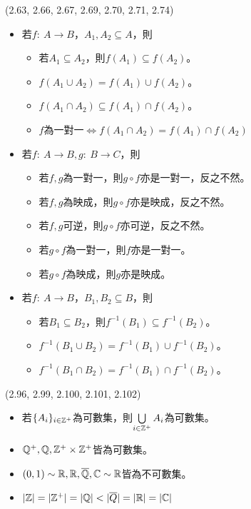\item \begin{theorem}{(2.63, 2.66, 2.67, 2.69, 2.70, 2.71, 2.74)} \quad\quad
    \begin{itemize}
        \item 若$f: \ A \rightarrow B$，$A_1, A_2 \subseteq A$，則
            \begin{itemize}
                \item 若$A_1 \subseteq A_2$，則$f(A_1) \subseteq f(A_2)$。
                \item $f(A_1 \cup A_2) = f(A_1) \cup f(A_2)$。
                \item $f(A_1 \cap A_2) \subseteq f(A_1) \cap f(A_2)$。
                \item $f$為一對一$\iff$$f(A_1 \cap A_2) = f(A_1) \cap f(A_2)$
            \end{itemize}
        \item 若$f: \ A \rightarrow B, g: \ B \rightarrow C$，則
            \begin{itemize}
                \item 若$f, g$為一對一，則$g \circ f$亦是一對一，反之不然。
                \item 若$f, g$為映成，則$g \circ f$亦是映成，反之不然。
                \item 若$f, g$可逆，則$g \circ f$亦可逆，反之不然。
                \item 若$g \circ f$為一對一，則$f$亦是一對一。
                \item 若$g \circ f$為映成，則$g$亦是映成。
            \end{itemize}
        \item 若$f: \ A \rightarrow B$，$B_1, B_2 \subseteq B$，則
            \begin{itemize}
                \item 若$B_1 \subseteq B_2$，則$f^{-1}(B_1) \subseteq f^{-1}(B_2)$。
                \item $f^{-1}(B_1 \cup B_2) = f^{-1}(B_1) \cup f^{-1}(B_2)$。
                \item $f^{-1}(B_1 \cap B_2) = f^{-1}(B_1) \cap f^{-1}(B_2)$。
            \end{itemize}
    \end{itemize}
\end{theorem}

\item \begin{theorem}{(2.96, 2.99, 2.100, 2.101, 2.102)} \quad\quad
    \begin{itemize}
        \item 若$\{A_i\}_{i \in \mathbb{Z}^+}$為可數集，則$\bigcup\limits_{i \in \mathbb{Z}^+}A_i$為可數集。
        \item $\mathbb{Q}^+, \mathbb{Q}, \mathbb{Z}^+ \times \mathbb{Z}^+$皆為可數集。
        \item $(0, 1) \sim \mathbb{R}, \mathbb{R}, \overline{\mathbb{Q}}, \mathbb{C} \sim \mathbb{R}$皆為不可數集。
        \item $|\mathbb{Z}| = |\mathbb{Z}^+| = |\mathbb{Q}| < |\overline{Q}| = |\mathbb{R}| = |\mathbb{C}|$
    \end{itemize}
\end{theorem}
